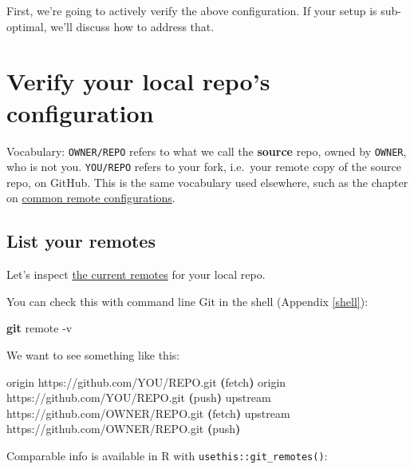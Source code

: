 \documentclass[
]{book}
\newenvironment{Shaded}{\begin{snugshade}}{\end{snugshade}}
\newcommand{\AttributeTok}[1]{\textcolor[rgb]{0.13,0.29,0.53}{#1}}
\newcommand{\ErrorTok}[1]{\textcolor[rgb]{0.64,0.00,0.00}{\textbf{#1}}}
\newcommand{\ExtensionTok}[1]{#1}
\newcommand{\FunctionTok}[1]{\textcolor[rgb]{0.13,0.29,0.53}{\textbf{#1}}}
\newcommand{\KeywordTok}[1]{\textcolor[rgb]{0.13,0.29,0.53}{\textbf{#1}}}
\newcommand{\NormalTok}[1]{#1}
\begin{document}
First, we're going to actively verify the above configuration.
If your setup is sub-optimal, we'll discuss how to address that.

\section{Verify your local repo's configuration}\label{verify-your-local-repos-configuration}

Vocabulary: \texttt{OWNER/REPO} refers to what we call the \textbf{source} repo, owned by \texttt{OWNER}, who is not you.
\texttt{YOU/REPO} refers to your fork, i.e.~your remote copy of the source repo, on GitHub.
This is the same vocabulary used elsewhere, such as the chapter on \hyperref[common-remote-setups]{common remote configurations}.

\subsection{List your remotes}\label{list-your-remotes}

Let's inspect \hyperref[git-remotes]{the current remotes} for your local repo.

You can check this with command line Git in the shell (Appendix \ref{shell}):

\begin{Shaded}
\begin{Highlighting}[]
\FunctionTok{git}\NormalTok{ remote }\AttributeTok{{-}v}
\end{Highlighting}
\end{Shaded}

We want to see something like this:

\begin{Shaded}
\begin{Highlighting}[]
\ExtensionTok{origin}\NormalTok{    https://github.com/YOU/REPO.git }\ErrorTok{(}\ExtensionTok{fetch}\KeywordTok{)}
\ExtensionTok{origin}\NormalTok{    https://github.com/YOU/REPO.git }\ErrorTok{(}\ExtensionTok{push}\KeywordTok{)}
\ExtensionTok{upstream}\NormalTok{  https://github.com/OWNER/REPO.git }\ErrorTok{(}\ExtensionTok{fetch}\KeywordTok{)}
\ExtensionTok{upstream}\NormalTok{  https://github.com/OWNER/REPO.git }\ErrorTok{(}\ExtensionTok{push}\KeywordTok{)}
\end{Highlighting}
\end{Shaded}

Comparable info is available in R with \texttt{usethis::git\_remotes()}:
\end{document}
